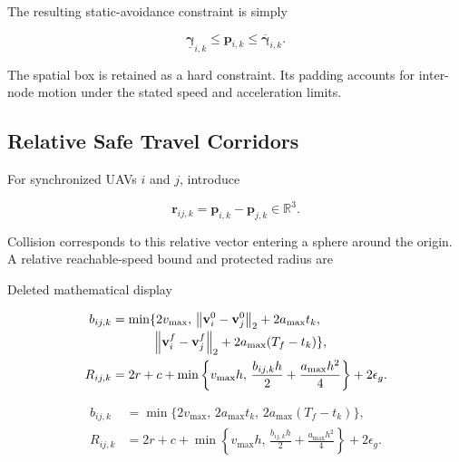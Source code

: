 \documentclass[electronics,article,submit,moreauthors]{Definitions/mdpi}
\newcommand{\R}{\mathbb{R}}
\newcommand{\norm}[1]{\left\lVert #1\right\rVert}
\newcommand{\bp}{\mathbf{p}}
\newcommand{\bv}{\mathbf{v}}
\providecommand{\DIFaddbegin}{}\providecommand{\DIFaddend}{} %
\providecommand{\DIFdelbegin}{}\providecommand{\DIFdelend}{} %
\begin{document}
The resulting static-avoidance constraint is simply

\begin{equation}
 \underline{\boldsymbol\gamma}_{i,k}\leq\bp_{i,k}\leq\overline{\boldsymbol\gamma}_{i,k}.
 \label{eq:withinSTC}
\end{equation}

The spatial box is retained as a hard constraint. Its padding accounts for inter-node motion under the stated speed and acceleration limits.


\subsection{Relative Safe Travel Corridors}

For synchronized UAVs $i$ and $j$, introduce

\begin{equation}
 \mathbf r_{ij,k}=\bp_{i,k}-\bp_{j,k}\in\R^3.
 \label{eq:relative}
\end{equation}

Collision corresponds to this relative vector entering a sphere around the origin. A relative reachable-speed bound and protected radius are

\DIFdelbegin 

\begin{mdframed}[nobreak=true,linecolor=RevisionRed,linewidth=.65pt,innerleftmargin=5pt,innerrightmargin=5pt,innertopmargin=2pt,innerbottommargin=2pt,skipabove=6pt,skipbelow=6pt]
\color{RevisionRed}
{\scriptsize Deleted mathematical display}\par
\begin{align*}
 b_{ij,k}&=\min\{2v_{\max},\,\norm{\bv_i^0-\bv_j^0}_2+2a_{\max}t_k,\nonumber\\[-2pt]
 &\hphantom{=\min\{}\norm{\bv_i^f-\bv_j^f}_2+2a_{\max}(T_f-t_k)\},\\
 R_{ij,k}&=2r+c+\min\left\{v_{\max}h,\,
 \frac{b_{ij,k}h}{2}+\frac{a_{\max}h^2}{4}\right\}+2\epsilon_g.
\end{align*}
\end{mdframed}


\DIFdelend \DIFaddbegin 
\begin{mdframed}[nobreak=true,linecolor=RevisionBlue,linewidth=.65pt,innerleftmargin=5pt,innerrightmargin=5pt,innertopmargin=2pt,innerbottommargin=2pt,skipabove=6pt,skipbelow=6pt]
\color{RevisionBlue}
\begin{subequations}\label{eq:relativepadding}\begin{align}
 b_{ij,k}&=\min\{2v_{\max},\,2a_{\max}t_k,\,2a_{\max}(T_f-t_k)\},\\
 R_{ij,k}&=2r+c+\min\left\{v_{\max}h,\,
 \frac{b_{ij,k}h}{2}+\frac{a_{\max}h^2}{4}\right\}+2\epsilon_g.
\end{align}\end{subequations}
\end{mdframed}
\end{document}
